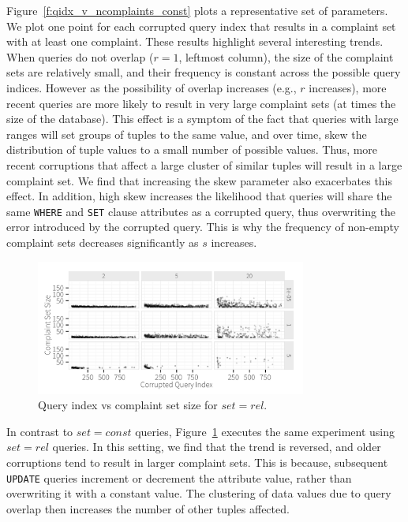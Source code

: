 Figure~\ref{f:qidx_v_ncomplaints_const} plots a representative set of parameters.  We plot one point
for each corrupted query index that results in a complaint set with at least one complaint. 
These results highlight several interesting trends.  When queries do not overlap ($r = 1$, leftmost column),
the size of the complaint sets are relatively small, and their frequency is constant across the possible query indices.
However as the possibility of overlap increases (e.g., $r$ increases), more recent queries are more likely to result in
very large complaint sets (at times the size of the database).   
This effect is a symptom of the fact that queries with large ranges will set groups of tuples to the same value,
and over time, skew the distribution of tuple values to a small number of possible values.
Thus, more recent corruptions that affect a large cluster of similar tuples will result in a large complaint set.
We find that increasing the skew parameter also exacerbates this effect.  
In addition, high skew increases the likelihood that queries will share the same \texttt{WHERE} and \texttt{SET} clause 
attributes as a corrupted query, thus overwriting the error introduced by the corrupted query.  
This is why the frequency of non-empty complaint sets decreases significantly as $s$ increases.


\begin{figure}[h]
\centering
\includegraphics[width = 3.5in]{figures/qidxsimulation/qidx_v_ncomplaints_20attrs_rel}
\caption{Query index vs complaint set size for $set = rel$.}
\label{f:qidx_v_ncomplaints_rel} 
\end{figure}

In contrast to $set=const$ queries, Figure~\ref{f:qidx_v_ncomplaints_rel} executes the 
same experiment using $set=rel$ queries.  In this setting, we find that the trend is
reversed, and older corruptions tend to result in larger complaint sets.  This is because,
subsequent \texttt{UPDATE} queries increment or decrement the attribute value, rather than
overwriting it with a constant value.  The clustering of data values due to query overlap
then increases the number of other tuples affected.


